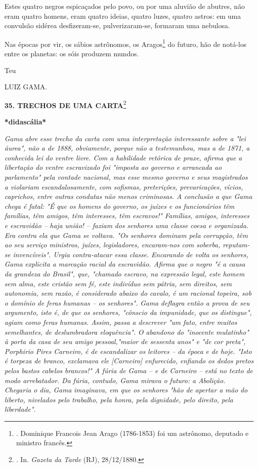 Estes quatro negros espicaçados pelo povo, ou por uma aluvião de
abutres, não eram quatro homens, eram quatro ideias, quatro luzes,
quatro astros: em uma convulsão sidérea desfizeram-se, pulverizaram-se,
formaram uma nebulosa.

Nas épocas por vir, os sábios astrônomos, os Aragos\footnote{. Dominique
  Francois Jean Arago (1786-1853) foi um astrônomo, deputado e ministro
  francês.} do futuro, hão
de notá-los entre os planetas: os sóis produzem mundos.

Teu

LUIZ GAMA.

\textbf{35. TRECHOS DE UMA CARTA}\footnote{. In. \emph{Gazeta da Tarde}
  (RJ), 28/12/1880.}

\textbf{*didascália*}

\emph{Gama abre esse trecho da carta com uma interpretação interessante
sobre a "lei áurea", não a de 1888, obviamente, porque não a
testemunhou, mas a de 1871, a conhecida lei do ventre livre. Com a
habilidade retórica de praxe, afirma que a libertação do ventre
escravizado foi "imposta ao governo e arrancada ao parlamento" pela
vontade nacional, mas esse mesmo governo e seus magistrados a violariam
escandalosamente, com sofismas, preterições, prevaricações, vícios,
caprichos, entre outras condutas não menos criminosas. A conclusão a que
Gama chega é fatal: "É que os homens do governo, os juízes e os
funcionários têm famílias, têm amigos, têm interesses, têm escravos!"
Famílias, amigos, interesses e escravidão -- haja união! -- faziam dos
senhores uma classe coesa e organizada. Era contra ela que Gama se
voltava. "Os senhores dominam pela corrupção, têm ao seu serviço
ministros, juízes, legisladores, encaram-nos com soberba, reputam-se
invencíveis". Urgia contra-atacar essa classe. Encarando de volta os
senhores, Gama explicita a marcação racial da escravidão. Afirma que o
negro "é a causa da grandeza do Brasil", que, "chamado escravo, na
expressão legal, este homem sem alma, este cristão sem fé, este
indivíduo sem pátria, sem direitos, sem autonomia, sem razão, é
considerado abaixo do cavalo, é um racional topeira, sob o domínio de
feras humanas -- os senhores". Gama deflagra então a prova de seu
argumento, isto é, de que os senhores, "cônscio da impunidade, que os
distingue", agiam como feras humanas. Assim, passa a descrever "um fato,
entre muitos semelhantes, de deslumbradora eloquência". O abandono do
"inocente mulatinho" à porta da casa de seu amigo pessoal,"maior de
sessenta anos" e "de cor preta", Porphirio Pires Carneiro, é de
escandalizar os leitores -- da época e de hoje. "Isto é torpeza de
branco, exclamava ele {[}Carneiro{]} enfurecido, enfiando os dedos
pretos pelos bastos cabelos brancos!" A fúria de Gama -- e de Carneiro
-- está no texto de modo arrebatador. Da fúria, contudo, Gama mirava o
futuro: a Abolição. Chegaria o dia, Gama imaginava, em que os senhores
"hão de apertar a mão do liberto, nivelados pelo trabalho, pela honra,
pela dignidade, pelo direito, pela liberdade". }

